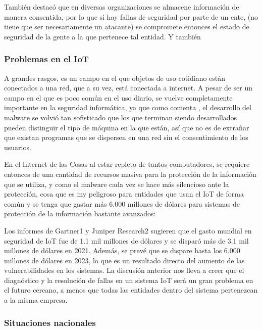 También \textcite{Banja2020} destacó que en diversas organizaciones se almacene
información de manera consentida, por lo que si hay fallas de seguridad por
parte de un ente, (no tiene que ser necesariamente un atacante) se compromete
entonces el estado de seguridad de la gente a la que pertenece tal entidad. Y
también 

\subsubsection{Problemas en el IoT}

A grandes rasgos, es un campo en el que objetos de uso cotidiano están
conectados a una red, que a su vez, está conectada a internet. A pesar de ser un
campo en el que es poco común en el uso diario, se vuelve completamente
importante en la seguridad informática, ya que como comenta
\textcite{Aboaoja2022}, el desarrollo del malware se volvió tan sofisticado que
los que terminan siendo desarrollados pueden distinguir el tipo de máquina en
la que están, así que no es de extrañar que existan programas que se dispersen
en una red sin el consentimiento de los usuarios.

En el Internet de las Cosas al estar repleto de tantos computadores, se requiere
entonces de una cantidad de recursos masiva para la protección de la información
que se utiliza, y como el malware cada vez se hace más silencioso ante la
protección, cosa que es my peligroso para entidades que usan el IoT de forma
común y se tenga que gastar más 6.000 millones de dólares para sistemas de
protección de la información bastante avanzados:

\begin{displayquote}
  Los informes de Gartner1 y Juniper Research2 sugieren que el gasto mundial en
  seguridad de IoT fue de 1.1 mil millones de dólares y se disparó más de 3.1
  mil millones de dólares en 2021. Además, se prevé que se dispare hasta los
  6.000 millones de dólares en 2023, lo que es un resultado directo del aumento
  de las vulnerabilidades en los sistemas. La discusión anterior nos lleva a
  creer que el diagnóstico y la resolución de fallas en un sistema IoT será un
  gran problema en el futuro cercano, a menos que todas las entidades dentro del
  sistema pertenezcan a la misma empresa. \parencite{Singh2022}
\end{displayquote}

\subsubsection{Situaciones nacionales}


